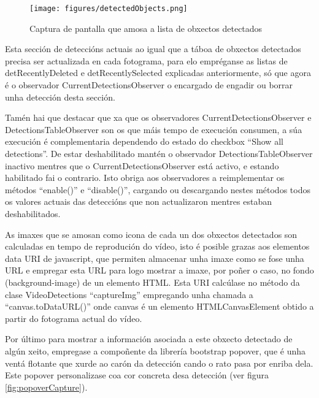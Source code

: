         \begin{figure}[htp]
        \begin{center}
            \texttt{[image: figures/detectedObjects.png]}
            \caption{Captura de pantalla que amosa a lista de obxectos detectados}
        \label{fig:detectedObjects}
        \end{center}
        \end{figure}
    
        Esta sección de deteccións actuais ao igual que a táboa de obxectos detectados precisa ser 
        actualizada en cada fotograma, para elo empréganse as listas de detRecentlyDeleted e 
        detRecentlySelected explicadas anteriormente, só que agora é o observador 
        CurrentDetectionsObserver o encargado de engadir ou borrar unha detección desta sección.
        
        Tamén hai que destacar que xa que os observadores CurrentDetectionsObserver e 
        DetectionsTableObserver son os que máis tempo de execución consumen, a súa execución é 
        complementaria dependendo do estado do checkbox ``Show all detections''. De estar
        deshabilitado mantén o observador DetectionsTableObserver inactivo mentres que o 
        CurrentDetectionsObserver está activo, e estando habilitado fai o contrario. Isto obriga aos
        observadores a reimplementar os métodos ``enable()'' e ``disable()'', cargando ou
        descargando nestes métodos todos os valores actuais das deteccións que non actualizaron mentres
        estaban deshabilitados.
        
        As imaxes que se amosan como icona de cada un dos obxectos detectados son calculadas en tempo de
        reprodución do vídeo, isto é posible grazas aos elementos data URI\cite{data-uris} de javascript,
        que permiten almacenar unha imaxe como se fose unha URL e empregar esta URL para logo mostrar a 
        imaxe, por poñer o caso, no fondo (background-image) de un elemento HTML. Esta URI calcúlase 
        no método da clase VideoDetections ``captureImg'' empregando unha chamada a ``canvas.toDataURL()''
        onde canvas é un elemento HTMLCanvasElement obtido a partir do fotograma actual do vídeo.
        
        Por último para mostrar a información asociada a este obxecto detectado de algún xeito, 
        empregase a compoñente da librería bootstrap popover, que é unha ventá flotante que xurde ao
        carón da detección cando o rato pasa por enriba dela. Este popover personalizase coa cor 
        concreta desa detección (ver figura \ref{fig:popoverCapture}).
        
